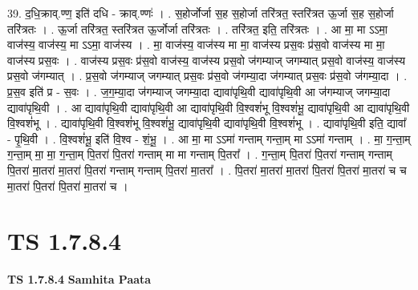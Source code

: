 \documentclass[17pt]{extarticle}
\begin{document}
39. द॒धि॒क्राव्.ण्ण॒ इति॑ दधि - क्राव्.ण्णः॑ । . स॒होर्जोर्जा स॒ह स॒होर्जा तरि॑त्रत॒ स्तरि॑त्रत ऊ॒र्जा स॒ह स॒होर्जा तरि॑त्रतः । . ऊ॒र्जा तरि॑त्रत॒ स्तरि॑त्रत ऊ॒र्जोर्जा तरि॑त्रतः । . तरि॑त्रत॒ इति॒ तरि॑त्रतः । . आ मा॒ मा ऽऽमा॒ वाज॑स्य॒ वाज॑स्य॒ मा ऽऽमा॒ वाज॑स्य । . मा॒ वाज॑स्य॒ वाज॑स्य मा मा॒ वाज॑स्य प्रस॒वः प्र॑स॒वो वाज॑स्य मा मा॒ वाज॑स्य प्रस॒वः । . वाज॑स्य प्रस॒वः प्र॑स॒वो वाज॑स्य॒ वाज॑स्य प्रस॒वो ज॑गम्याज् जगम्यात् प्रस॒वो वाज॑स्य॒ वाज॑स्य प्रस॒वो ज॑गम्यात् । . प्र॒स॒वो ज॑गम्याज् जगम्यात् प्रस॒वः प्र॑स॒वो ज॑गम्या॒दा ज॑गम्यात् प्रस॒वः प्र॑स॒वो ज॑गम्या॒दा । . प्र॒स॒व इति॑ प्र - स॒वः । . ज॒ग॒म्या॒दा ज॑गम्याज् जगम्या॒दा द्यावा॑पृथि॒वी द्यावा॑पृथि॒वी आ ज॑गम्याज् जगम्या॒दा द्यावा॑पृथि॒वी । . आ द्यावा॑पृथि॒वी द्यावा॑पृथि॒वी आ द्यावा॑पृथि॒वी वि॒श्वशं॑भू वि॒श्वशं॑भू॒ द्यावा॑पृथि॒वी आ द्यावा॑पृथि॒वी वि॒श्वशं॑भू । . द्यावा॑पृथि॒वी वि॒श्वशं॑भू वि॒श्वशं॑भू॒ द्यावा॑पृथि॒वी द्यावा॑पृथि॒वी वि॒श्वशं॑भू । . द्यावा॑पृथि॒वी इति॒ द्यावा᳚ - पृ॒थि॒वी । . वि॒श्वशं॑भू॒ इति॑ वि॒श्व - शं॒भू॒ । . आ मा॒ मा ऽऽमा॑ गन्ताम् गन्ता॒म् मा ऽऽमा॑ गन्ताम् । . मा॒ ग॒न्ता॒म् ग॒न्ता॒म् मा॒ मा॒ ग॒न्ता॒म् पि॒तरा॑ पि॒तरा॑ गन्ताम् मा मा गन्ताम् पि॒तरा᳚ । . ग॒न्ता॒म् पि॒तरा॑ पि॒तरा॑ गन्ताम् गन्ताम् पि॒तरा॑ मा॒तरा॑ मा॒तरा॑ पि॒तरा॑ गन्ताम् गन्ताम् पि॒तरा॑ मा॒तरा᳚ । . पि॒तरा॑ मा॒तरा॑ मा॒तरा॑ पि॒तरा॑ पि॒तरा॑ मा॒तरा॑ च च मा॒तरा॑ पि॒तरा॑ पि॒तरा॑ मा॒तरा॑ च । \newline
\pagebreak
{}
\section*{ TS 1.7.8.4 }

\textbf{TS 1.7.8.4 } \newline
\textbf{Samhita Paata} \newline
\end{document}
